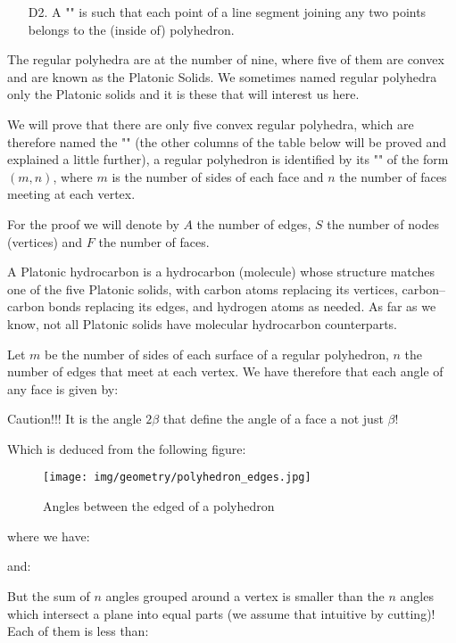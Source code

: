 {\begin{enumerate}
		\item[D2.] A "" is such that each point of a line segment joining any two points belongs to the (inside of) polyhedron.
	\end{enumerate}
	The regular polyhedra are at the number of nine, where five of them are convex and are known as the Platonic Solids. We sometimes named regular polyhedra only the Platonic solids and it is these that will interest us here.
	
	\begin{theorem}
	We will prove that there are only five convex regular polyhedra, which are therefore named the "" (the other columns of the table below will be proved and explained a little further), a regular polyhedron is identified by its "" of the form $(m,n)$, where $m$ is the number of sides of each face and $n$ the number of faces meeting at each vertex.
	
	For the proof  we will denote by $A$ the number of edges, $S$ the number of nodes (vertices) and $F$ the number of faces.
	\end{theorem}
	
	\begin{tcolorbox}[title=Remark,colframe=black,arc=10pt]
	A Platonic hydrocarbon is a hydrocarbon (molecule) whose structure matches one of the five Platonic solids, with carbon atoms replacing its vertices, carbon–carbon bonds replacing its edges, and hydrogen atoms as needed. As far as we know, not all Platonic solids have molecular hydrocarbon counterparts.
	\end{tcolorbox}
	\begin{dem}
	Let $m$ be the number of sides of each surface of a regular polyhedron, $n$ the number of edges that meet at each vertex. We have therefore that each angle of any face is given by:
	
	Caution!!! It is the angle $2\beta$ that define the angle of a face a not just $\beta$!
	
	Which is deduced from the following figure:
	\begin{figure}[H]
		\centering
		\texttt{[image: img/geometry/polyhedron\_edges.jpg]}
		\caption{Angles between the edged of a polyhedron}
	\end{figure}
	where we have:
	
	and:
	
	But the sum of $n$ angles grouped around a vertex is smaller than the $n$ angles which intersect a plane into equal parts (we assume that intuitive by cutting)! Each of them is less than:
	

\end{dem}}
